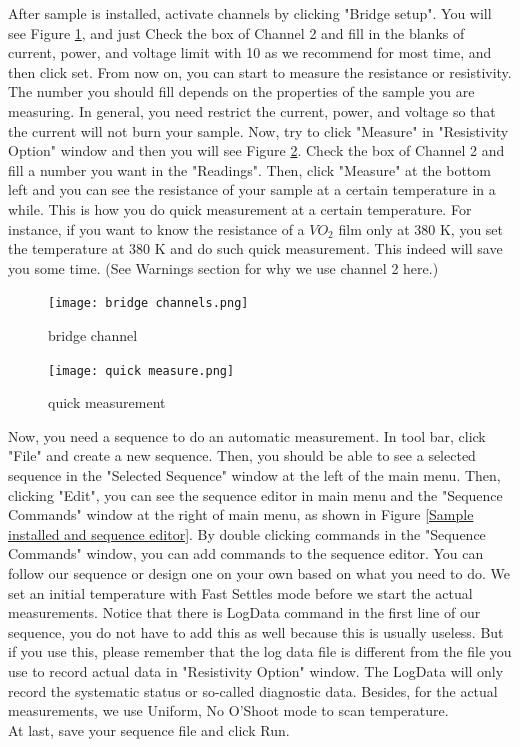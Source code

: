 \documentclass{article}
\begin{document}
        After sample is installed, activate channels by clicking "Bridge setup". You will see Figure \ref{bridge channel}, and just Check the box of Channel 2 and fill in the blanks of current, power, and voltage limit with 10 as we recommend for most time, and then click set. From now on, you can start to measure the resistance or resistivity. The number you should fill depends on the properties of the sample you are measuring. In general, you need restrict the current, power, and voltage so that the current will not burn your sample. Now, try to click "Measure" in "Resistivity Option" window and then you will see Figure \ref{quick measurement}. Check the box of Channel 2 and fill a number you want in the "Readings". Then, click "Measure" at the bottom left and you can see the resistance of your sample at a certain temperature in a while. This is how you do quick measurement at a certain temperature. For instance, if you want to know the resistance of a $VO_{2}$ film only at 380 K, you set the temperature at 380 K and do such quick measurement. This indeed will save you some time. (See Warnings section for why we use channel 2 here.)
        
        \begin{figure}[H]
            \centering
            \texttt{[image: bridge channels.png]}
            \caption{bridge channel}
            \label{bridge channel}
        \end{figure}

        
        \begin{figure}[H]
            \centering
            \texttt{[image: quick measure.png]}
            \caption{quick measurement}
            \label{quick measurement}
        \end{figure}

        Now, you need a sequence to do an automatic measurement. In tool bar, click "File" and create a new sequence. Then, you should be able to see a selected sequence in the "Selected Sequence" window at the left of the main menu. Then, clicking "Edit", you can see the sequence editor in main menu and the "Sequence Commands" window at the right of main menu, as shown in Figure \ref{Sample installed and sequence editor}. By double clicking commands in the "Sequence Commands" window, you can add commands to the sequence editor. You can follow our sequence or design one on your own based on what you need to do. We set an initial temperature with Fast Settles mode before we start the actual measurements. Notice that there is LogData command in the first line of our sequence, you do not have to add this as well because this is usually useless. But if you use this, please remember that the log data file is different from the file you use to record actual data in "Resistivity Option" window. The LogData will only record the systematic status or so-called diagnostic data. Besides, for the actual measurements, we use Uniform, No O'Shoot mode to scan temperature.\\
        At last, save your sequence file and click Run.\\
    
\end{document}
